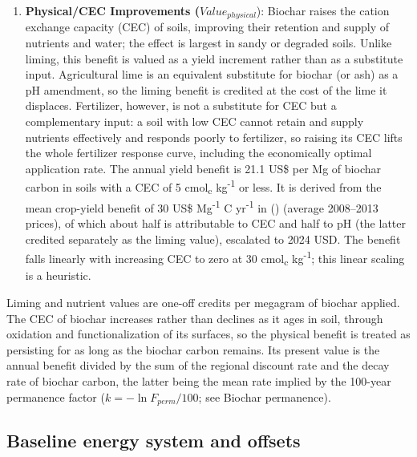 \documentclass[
  letterpaper,
]{article}
\begin{document}
\begin{enumerate}
  but they transfer value rather than change the economic value of the
  fertilizer displaced. Elemental P and K contents are converted to
  their oxide equivalents (×2.29 for
  P\textsubscript{2}O\textsubscript{5} and ×1.20 for
  K\textsubscript{2}O) before pricing, and each nutrient is credited at
  its first-year plant availability (N 10\%, P 50\%, K 80\%;
  Table~\ref{tbl-parameters}).
\item
  \textbf{Physical/CEC Improvements (}\(Value_{physical}\)): Biochar
  raises the cation exchange capacity (CEC) of soils, improving their
  retention and supply of nutrients and water; the effect is largest in
  sandy or degraded soils. Unlike liming, this benefit is valued as a
  yield increment rather than as a substitute input. Agricultural lime
  is an equivalent substitute for biochar (or ash) as a pH amendment, so
  the liming benefit is credited at the cost of the lime it displaces.
  Fertilizer, however, is not a substitute for CEC but a complementary
  input: a soil with low CEC cannot retain and supply nutrients
  effectively and responds poorly to fertilizer, so raising its CEC
  lifts the whole fertilizer response curve, including the economically
  optimal application rate. The annual yield benefit is 21.1 US\$ per Mg
  of biochar carbon in soils with a CEC of 5 cmol\textsubscript{c}
  kg\textsuperscript{-1} or less. It is derived from the mean crop-yield
  benefit of 30 US\$ Mg\textsuperscript{-1} C yr\textsuperscript{-1} in
  () (average 2008--2013
  prices), of which about half is attributable to CEC and half to pH
  (the latter credited separately as the liming value), escalated to
  2024 USD. The benefit falls linearly with increasing CEC to zero at 30
  cmol\textsubscript{c} kg\textsuperscript{-1}; this linear scaling is a
  heuristic.
\end{enumerate}

Liming and nutrient values are one-off credits per megagram of biochar
applied. The CEC of biochar increases rather than declines as it ages in
soil, through oxidation and functionalization of its surfaces, so the
physical benefit is treated as persisting for as long as the biochar
carbon remains. Its present value is the annual benefit divided by the
sum of the regional discount rate and the decay rate of biochar carbon,
the latter being the mean rate implied by the 100-year permanence factor
(\(k = -\ln F_{perm}/100\); see Biochar permanence).

\subsection{Baseline energy system and
offsets}\label{baseline-energy-system-and-offsets}
\end{document}
